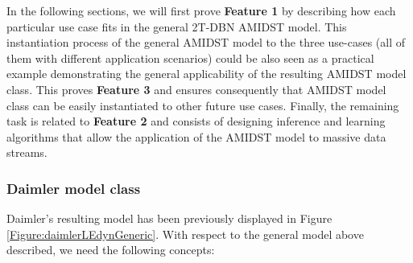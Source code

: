 In the following sections, we will first prove \textbf{Feature 1} by describing how each particular use case fits in the general 2T-DBN AMIDST model. This instantiation process of the general AMIDST model to the three use-cases (all of them with different application scenarios) could be also seen as a practical example demonstrating the general applicability of the resulting AMIDST model class. This proves \textbf{Feature 3} and ensures consequently that AMIDST model class can be easily instantiated to other future use cases. Finally, the remaining task is related to \textbf{Feature 2} and consists of designing inference and learning algorithms that allow the application of the AMIDST model to massive data streams. 


\subsubsection{Daimler model class}\label{daimlerAMIDSTModels}


Daimler's resulting model has been previously displayed in Figure \ref{Figure:daimlerLEdynGeneric}. With respect to the general model above described, we need the following concepts:

